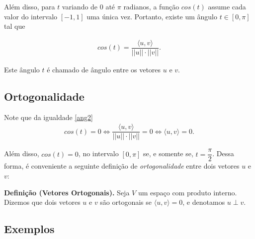 Além disso, para $ t$ variando de 0 até $\pi$ radianos, a função $cos(t)$ assume cada valor do intervalo $[-1,1]$ uma única vez. Portanto, existe um ângulo $t \in [ 0, \pi]$ tal que

\begin{align}
cos(t)=\dfrac{\langle u, v\rangle}{ ||u||\cdot ||v|| }. \label{ang2}\end{align}

Este ângulo $t$  é chamado de ângulo entre os vetores $u$ e $v$.

\subsection {\textbf{Ortogonalidade}}

Note que  da igualdade \eqref{ang2}
\begin{align*}
cos(t)=0  \Longleftrightarrow \dfrac{\langle u, v\rangle}{ ||u||\cdot ||v|| }=0 \Longleftrightarrow  \langle u, v \rangle =0. \label{ang}\end{align*}

Além disso, $cos(t)=0$, no intervalo $[0, \pi]$ se, e somente se, $t=\dfrac{\pi}{2}$.  Dessa forma,  é conveniente  a seguinte definição de \textit{ortogonalidade} entre dois vetores $u$ e $v$:


\vspace{0.7cm}
\textbf{Definição (Vetores Ortogonais).} Seja $V$ um espaço com produto interno. Dizemos que  dois vetores $u$ e $v$ são ortogonais se $ \langle u, v \rangle = 0$, e denotamos $u \perp v$.

\subsection{Exemplos}

